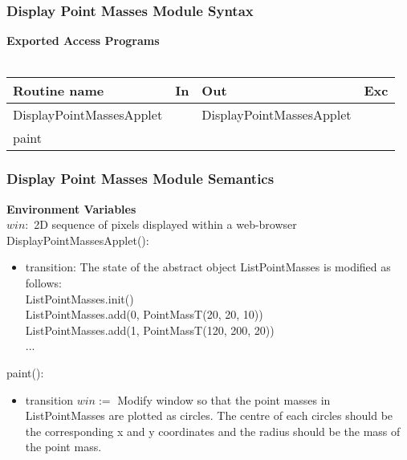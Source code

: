 \documentclass[t,12pt,numbers,fleqn]{beamer}
\begin{document}

\begin{frame}
\frametitle{Display Point Masses Module Syntax}

\textbf{Exported Access Programs}\\
~\newline
\begin{tabular}{| l | l | l | l |}
\hline
\textbf{Routine name} & \textbf{In} & \textbf{Out} & \textbf{Exc}\\
\hline
DisplayPointMassesApplet & ~ & DisplayPointMassesApplet & ~\\
\hline
paint & ~ & ~ & ~\\
\hline
\end{tabular}

\end{frame}


\begin{frame}
\frametitle{Display Point Masses Module Semantics}

\textbf{Environment Variables}\\
$\mathit{win}:$ 2D sequence of pixels displayed within a web-browser \\

\noindent DisplayPointMassesApplet():
\begin{itemize}
\item transition: The state of the abstract object ListPointMasses is modified as follows:\\
ListPointMasses.init()\\
ListPointMasses.add(0, PointMassT(20, 20, 10))\\
ListPointMasses.add(1, PointMassT(120, 200, 20))\\
...
\end{itemize}

\noindent paint():
\begin{itemize}
\item transition $win := $ Modify window so that the point masses in ListPointMasses 
are plotted as circles.  The centre of each circles should be the corresponding x and y coordinates and the radius should
be the mass of the point mass.
\end{itemize}

\end{frame}

\end{document}
